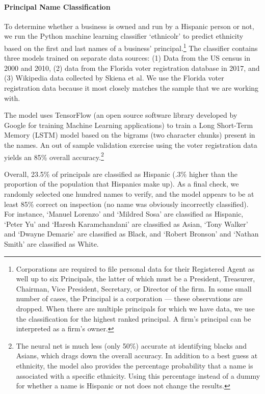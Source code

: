 \documentclass[11pt]{article}
\begin{document}
\paragraph{Principal Name Classification} To determine whether a business is owned and run by a Hispanic person or not, we run the Python machine learning classifier `ethnicolr' to predict ethnicity based on the first and last names of a business' principal.\footnote{ Corporations are required to file personal data for their Registered Agent as well up to six Principals, the latter of which must be a President, Treasurer, Chairman, Vice President, Secretary, or Director of the firm. In some small number of cases, the Principal is a corporation --- these observations are dropped. When there are multiple principals for which we have data, we use the classification for the highest ranked principal. A firm's principal can be interpreted as a firm's owner.} The classifier contains three models trained on separate data sources: (1) Data from the US census in 2000 and 2010, (2) data from the Florida voter registration database in 2017, and (3) Wikipedia data collected by Skiena et al. We use the Florida voter registration data because it most closely matches the sample that we are working with. 

The model uses TensorFlow (an open source software library developed by Google for training Machine Learning applications) to train a Long Short-Term Memory (LSTM) model based on the bigrams (two character chunks) present in the names. An out of sample validation exercise using the voter registration data yields an 85\% overall accuracy.\footnote{ The neural net is much less (only 50\%) accurate at identifying blacks and Asians, which drags down the overall accuracy. In addition to a best guess at ethnicity, the model also provides the percentage probability that a name is associated with a specific ethnicity. Using this percentage instead of a dummy for whether a name is Hispanic or not does not change the results. } 

Overall, 23.5\% of principals are classified as Hispanic (.3\% higher than the proportion of the population that Hispanics make up). As a final check, we randomly selected one hundred names to verify, and the model appears to be at least 85\% correct on inspection (no name was obviously incorrectly classified). For instance, `Manuel Lorenzo' and `Mildred Sosa' are classified as Hispanic, `Peter Yu' and `Haresh Karamchandani' are classified as Asian, `Tony Walker' and `Dwayne Demarie' are classified as Black, and `Robert Bronson' and `Nathan Smith' are classified as White. 
\end{document}
